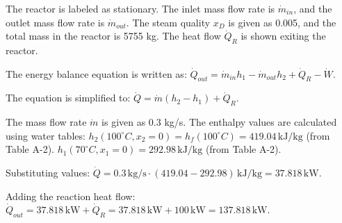 The reactor is labeled as stationary. The inlet mass flow rate is \( \dot{m}_{in} \), and the outlet mass flow rate is \( \dot{m}_{out} \). The steam quality \( x_D \) is given as 0.005, and the total mass in the reactor is 5755 kg. The heat flow \( \dot{Q}_R \) is shown exiting the reactor.  

The energy balance equation is written as:  
\( \dot{Q}_{out} = \dot{m}_{in} h_1 - \dot{m}_{out} h_2 + \dot{Q}_R - \dot{W} \).  

The equation is simplified to:  
\( \dot{Q} = \dot{m} (h_2 - h_1) + \dot{Q}_R \).  

The mass flow rate \( \dot{m} \) is given as 0.3 kg/s. The enthalpy values are calculated using water tables:  
\( h_2 (100^\circ C, x_2 = 0) = h_f (100^\circ C) = 419.04 \, \text{kJ/kg} \) (from Table A-2).  
\( h_1 (70^\circ C, x_1 = 0) = 292.98 \, \text{kJ/kg} \) (from Table A-2).  

Substituting values:  
\( \dot{Q} = 0.3 \, \text{kg/s} \cdot (419.04 - 292.98) \, \text{kJ/kg} = 37.818 \, \text{kW} \).  

Adding the reaction heat flow:  
\( \dot{Q}_{out} = 37.818 \, \text{kW} + \dot{Q}_R = 37.818 \, \text{kW} + 100 \, \text{kW} = 137.818 \, \text{kW} \).